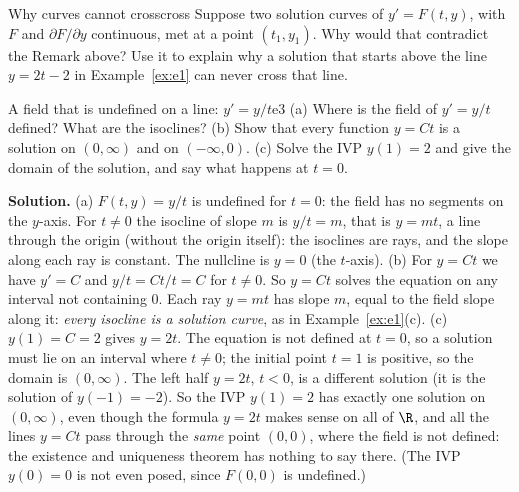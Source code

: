 \documentclass[11pt]{article}
\begin{document}
\begin{think}{Why curves cannot cross}{cross}
Suppose two solution curves of $y'=F(t,y)$, with $F$ and $\partial F/\partial y$ continuous, met at a point $(t_1,y_1)$. Why would that contradict the Remark above? Use it to explain why a solution that starts above the line $y=2t-2$ in Example~\ref{ex:e1} can never cross that line.
\end{think}

\begin{exmp}{A field that is undefined on a line: $y'=y/t$}{e3}
(a) Where is the field of $y'=y/t$ defined? What are the isoclines? (b) Show that every function $y=Ct$ is a solution on $(0,\infty)$ and on $(-\infty,0)$. (c) Solve the IVP $y(1)=2$ and give the domain of the solution, and say what happens at $t=0$.

\textbf{Solution.} (a) $F(t,y)=y/t$ is undefined for $t=0$: the field has no segments on the $y$-axis. For $t\ne0$ the isocline of slope $m$ is $y/t=m$, that is $y=mt$, a line through the origin (without the origin itself): the isoclines are rays, and the slope along each ray is constant. The nullcline is $y=0$ (the $t$-axis).
(b) For $y=Ct$ we have $y'=C$ and $y/t=Ct/t=C$ for $t\ne0$. So $y=Ct$ solves the equation on any interval not containing $0$. Each ray $y=mt$ has slope $m$, equal to the field slope along it: \emph{every isocline is a solution curve}, as in Example~\ref{ex:e1}(c).
(c) $y(1)=C=2$ gives $y=2t$. The equation is not defined at $t=0$, so a solution must lie on an interval where $t\ne0$; the initial point $t=1$ is positive, so the domain is $(0,\infty)$. The left half $y=2t$, $t<0$, is a different solution (it is the solution of $y(-1)=-2$). So the IVP $y(1)=2$ has exactly one solution on $(0,\infty)$, even though the formula $y=2t$ makes sense on all of $\R$, and all the lines $y=Ct$ pass through the \emph{same} point $(0,0)$, where the field is not defined: the existence and uniqueness theorem has nothing to say there. (The IVP $y(0)=0$ is not even posed, since $F(0,0)$ is undefined.)
\begin{center}
\end{center}
\end{exmp}
\end{document}
